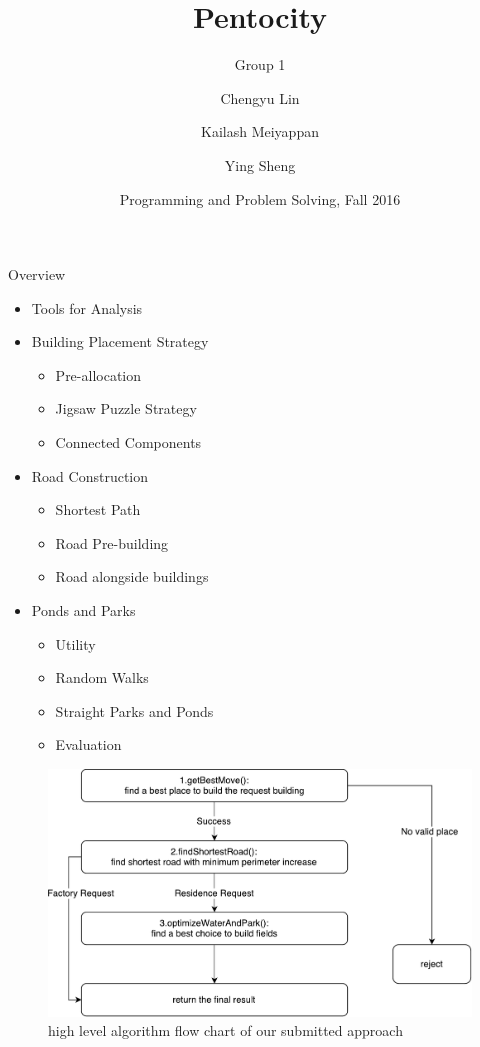 \documentclass{beamer}
\title{Pentocity}
\subtitle{Group 1}
\author{Chengyu Lin \and Kailash Meiyappan \and Ying Sheng}
\institute[Columbia University] %
{
  
  Columbia University}
\date{Programming and Problem Solving, Fall 2016}
\begin{document}
\begin{frame}
  \titlepage
\end{frame}
\begin{frame}{Overview}
  \begin{itemize}
  \item
    Tools for Analysis
  \item
    Building Placement Strategy
    \begin{itemize}
        \item Pre-allocation
        \item Jigsaw Puzzle Strategy
        \item Connected Components
    \end{itemize}
  \item
    Road Construction
    \begin{itemize}
        \item Shortest Path
        \item Road Pre-building
        \item Road alongside buildings
    \end{itemize}
  \item
    Ponds and Parks
    \begin{itemize}
        \item Utility
        \item Random Walks
        \item Straight Parks and Ponds
        \item Evaluation
    \end{itemize}
  \end{itemize}
\end{frame}



\begin{frame}
  \begin{figure}
\center
\includegraphics[scale=0.5]{pentos.pdf}
\caption{high level algorithm flow chart of our submitted approach}
\label{fig:pentos}
\end{figure}
\end{frame}
\end{document}
